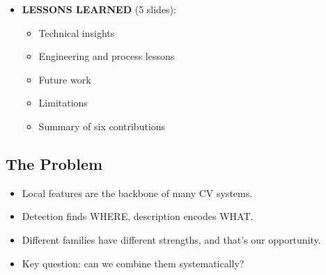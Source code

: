 \documentclass[11pt, letterpaper]{article}
\begin{document}
\begin{itemize}
\begin{itemize}
      \item Answering all four RQs
    \end{itemize}
  \item \textbf{LESSONS LEARNED} (5 slides):
    \begin{itemize}
      \item Technical insights
      \item Engineering and process lessons
      \item Future work
      \item Limitations
      \item Summary of six contributions
    \end{itemize}
\end{itemize}

\subsection{The Problem}
\begin{itemize}
  \item Local features are the backbone of many CV systems.
  \item Detection finds WHERE, description encodes WHAT.
  \item Different families have different strengths, and that's our opportunity.
  \item Key question: can we combine them systematically?
\end{itemize}

\end{document}
